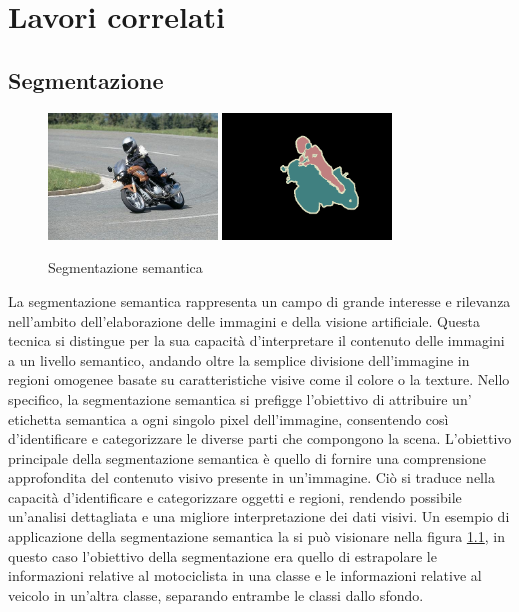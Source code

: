 \chapter{Lavori correlati} \label{chap:related_works}
\section{Segmentazione} \label{sec:segmentazione}

\begin{figure}[!ht]
	\begin{center}
		\includegraphics[width=0.4\textwidth]{Immagini/segmantion_example_image.png}
		\includegraphics[width=0.4\textwidth]{Immagini/segmantion_example_mask.png}
	\end{center}
	\caption{Segmentazione semantica}
	\label{fig:segmentazione}
\end{figure}

La segmentazione semantica rappresenta un campo di grande interesse e rilevanza
nell'ambito dell'elaborazione delle immagini e della visione artificiale. Questa
tecnica si distingue per la sua capacità d'interpretare il contenuto delle
immagini a un livello semantico, andando oltre la semplice divisione
dell'immagine in regioni omogenee basate su caratteristiche visive come il
colore o la texture. Nello specifico, la segmentazione semantica si prefigge
l'obiettivo di attribuire un' etichetta semantica a ogni singolo pixel
dell'immagine, consentendo così d'identificare e categorizzare le diverse parti
che compongono la scena.  L'obiettivo principale della segmentazione semantica è
quello di fornire una comprensione approfondita del contenuto visivo presente in
un'immagine. Ciò si traduce nella capacità d'identificare e categorizzare
oggetti e regioni, rendendo possibile un'analisi dettagliata e una migliore
interpretazione dei dati visivi.
Un esempio di applicazione della segmentazione semantica la si pu\`o visionare
nella figura \ref{fig:segmentazione}, in questo caso l'obiettivo della segmentazione era quello di
estrapolare le informazioni relative al motociclista in una classe e le informazioni relative
al veicolo in un'altra classe, separando entrambe le classi dallo sfondo.


